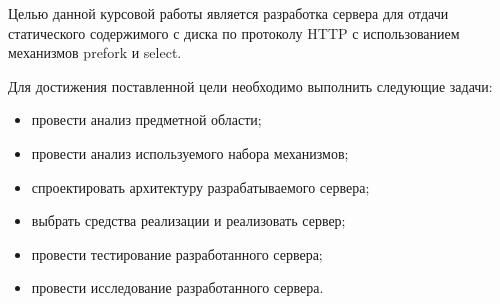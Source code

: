 
Целью данной курсовой работы является разработка сервера для отдачи статического содержимого с диска по протоколу HTTP с использованием механизмов prefork и select.

Для достижения поставленной цели необходимо выполнить следующие задачи:
\begin{itemize}
	\item провести анализ предметной области;
	\item провести анализ используемого набора механизмов;
	\item спроектировать архитектуру разрабатываемого сервера;
	\item выбрать средства реализации и реализовать сервер;
	\item провести тестирование разработанного сервера;
	\item провести исследование разработанного сервера.
\end{itemize}